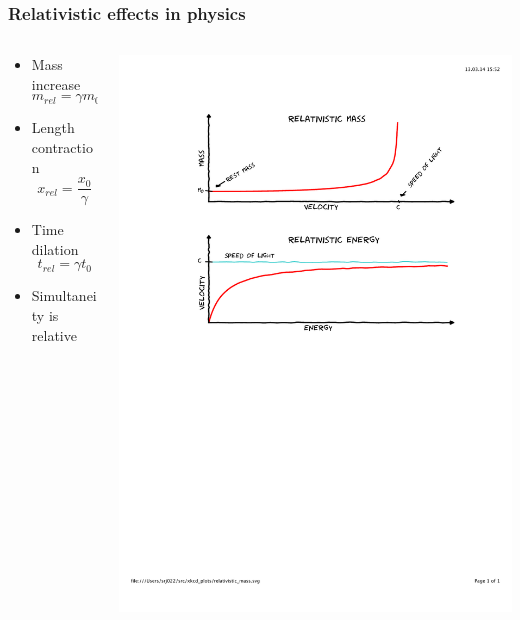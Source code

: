\documentclass[mathserif,10pt]{beamer}
\begin{document}
\begin{frame}
    \frametitle{Relativistic effects in physics}
    \begin{columns}
    \begin{column}{.40\textwidth}
    \begin{itemize}
	\item Mass increase
	    \begin{equation}
		\nonumber
		m_{rel} = \gamma m_0
	    \end{equation}
	\item Length contraction
	    \begin{equation}
		\nonumber
		x_{rel} = \frac{x_0}{\gamma}
	    \end{equation}
	\item Time dilation
	    \begin{equation}
		\nonumber
		t_{rel} = \gamma t_0
	    \end{equation}
	\item Simultaneity is relative
    \end{itemize}
    \end{column}
    \begin{column}{.60\textwidth}
	\centering
	\includegraphics[viewport = 100 400 520 750, clip, scale=0.45]{figures/mass_and_energy.pdf}\\
    \end{column}
    \end{columns}
\end{frame}
\end{document}
